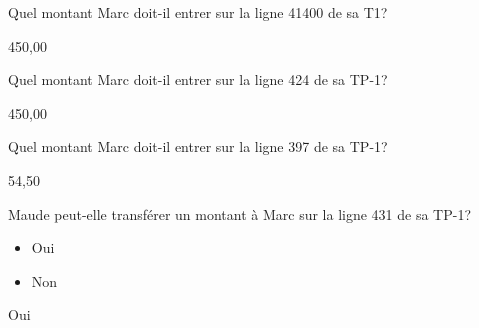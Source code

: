\begin{question}
	Quel montant Marc doit-il entrer sur la ligne 41400 de sa T1?
\end{question}
450,00

\begin{question}
	Quel montant Marc doit-il entrer sur la ligne 424 de sa TP-1?
\end{question}
450,00

\begin{question}
	Quel montant Marc doit-il entrer sur la ligne 397 de sa TP-1?
\end{question}
54,50

\begin{question}
	Maude peut-elle transférer un montant à Marc sur la ligne 431 de sa TP-1?
	\begin{itemize}
		\item Oui
		\item Non
	\end{itemize}
\end{question}
Oui
